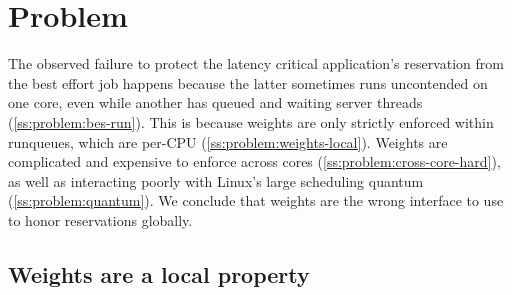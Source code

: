 \section{Problem}\label{s:problem}

The observed failure to protect the latency critical application's reservation
from the best effort job happens because the latter sometimes runs uncontended
on one core, even while another has queued and waiting server threads
(\autoref{ss:problem:bes-run}). This is because weights are only strictly
enforced within runqueues, which are per-CPU
(\autoref{ss:problem:weights-local}). Weights are complicated and expensive to
enforce across cores (\autoref{ss:problem:cross-core-hard}), as well as
interacting poorly with Linux's large scheduling quantum
(\autoref{ss:problem:quantum}). We conclude that weights are the wrong interface
to use to honor reservations globally.

\subsection{Weights are a local property}\label{ss:problem:bes-run}

